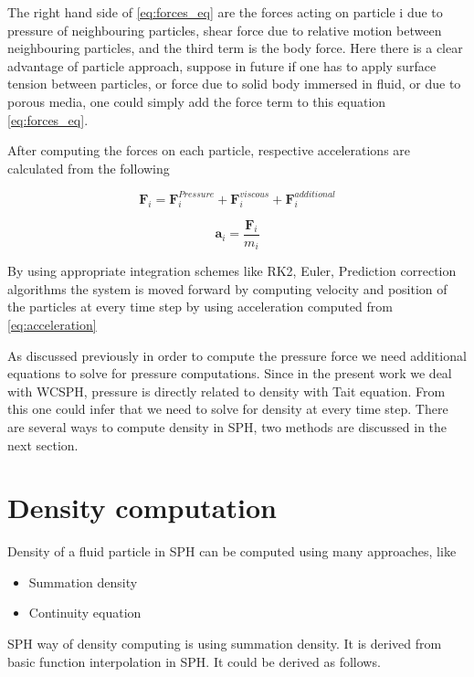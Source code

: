 The right hand side of \eqref{eq:forces_eq} are the forces acting on
particle i due to pressure of neighbouring particles, shear force due
to relative motion between neighbouring particles, and the third term
is the body force. Here there is a clear advantage of particle approach,
suppose in future if one has to apply surface tension between particles,
or force due to solid body immersed in fluid, or due to porous media,
one could simply add the force term to this equation \eqref{eq:forces_eq}.


After computing the forces on each particle, respective accelerations are calculated
from the following

\begin{equation*}
  \label{eq:total_force}
    \textbf{F}_i = \textbf{F}_{i}^{Pressure} + \textbf{F}_{i}^{viscous} + \textbf{F}_{i}^{additional}
\end{equation*}

\begin{equation}
  \label{eq:acceleration}
    \textbf{a}_i = \frac{\textbf{F}_i}{m_i}
\end{equation}

By using appropriate integration schemes like RK2, Euler, Prediction
correction algorithms the system is moved forward by computing
velocity and position of the particles at every time step by using
acceleration computed from \eqref{eq:acceleration}


As discussed previously in order to compute the pressure force we need
additional equations to solve for pressure computations. Since in the
present work we deal with WCSPH, pressure is directly related to
density with Tait equation. From this one could infer that we need to
solve for density at every time step. There are several ways to
compute density in SPH, two methods are discussed in the next section.


\section{Density computation}
\label{sec:density_comp}

Density of a fluid particle in SPH can be computed using many approaches, like

\begin{itemize}
\item Summation density
\item Continuity equation
\end{itemize}

SPH way of density computing is using summation density. It is derived from basic
function interpolation in SPH. It could be derived as follows.

